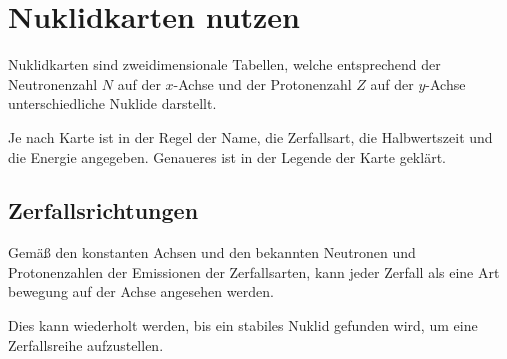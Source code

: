 \documentclass{article}
\begin{document}
 
\newcommand{\karte}[4]{
 \foreach \i in {0,...,5} { 
  \draw (#1, \i*0.5) -- (#1+2.5, \i*0.5);
  \draw (#1+\i*0.5, 0) -- (#1+\i*0.5, 2.5);
 };
 \node[above left] at (#1, 2.5) {$Z$}; 
 \node[below right] at (#1+2.5, 0) {$N$};
 
 \node[below] at (#1+1.25, 0) {#2-Strahlung};
 
 \draw[thick, red, ->] (#1+1.25, 1.25) -- ({#1+1.25+(#3*0.5)}, {1.25+(#4*0.5)});
} 
 
\section{Nuklidkarten nutzen}
Nuklidkarten sind zweidimensionale Tabellen, welche entsprechend der Neutronenzahl $N$ auf der $x$-Achse und der Protonenzahl $Z$ auf der $y$-Achse unterschiedliche Nuklide darstellt.
 
Je nach Karte ist in der Regel der Name, die Zerfallsart, die Halbwertszeit und die Energie angegeben. Genaueres ist in der Legende der Karte geklärt.
 
\subsection{Zerfallsrichtungen}
Gemäß den konstanten Achsen und den bekannten Neutronen und Protonenzahlen der Emissionen der Zerfallsarten, kann jeder Zerfall als eine Art bewegung auf der Achse angesehen werden.
\begin{center} 
\end{center}
Dies kann wiederholt werden, bis ein stabiles Nuklid gefunden wird, um eine Zerfallsreihe aufzustellen. 
 
\end{document}
